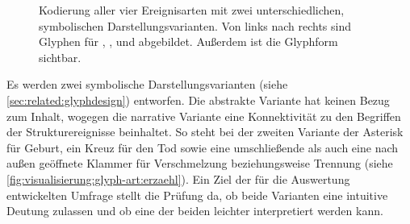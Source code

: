 \begin{figure}
	{\caption{Kodierung aller vier Ereignisarten mit zwei unterschiedlichen, symbolischen Darstellungsvarianten. Von links nach rechts sind Glyphen für , ,  und  abgebildet. Außerdem ist die Glyphform sichtbar.}\label{fig:visualisierung:glyph-art}}
\end{figure}

Es werden zwei symbolische Darstellungsvarianten (siehe \autoref{sec:related:glyphdesign}) entworfen. Die abstrakte Variante hat keinen Bezug zum Inhalt, wogegen die narrative Variante eine Konnektivität zu den Begriffen der Strukturereignisse beinhaltet. So steht bei der zweiten Variante der Asterisk für Geburt, ein Kreuz für den Tod sowie eine umschließende als auch eine nach außen geöffnete Klammer für Verschmelzung beziehungsweise Trennung (siehe \autoref{fig:visualisierung:glyph-art:erzaehl}). Ein Ziel der für die Auswertung entwickelten Umfrage stellt die Prüfung da, ob beide Varianten eine intuitive Deutung zulassen und ob eine der beiden leichter interpretiert werden kann. %

